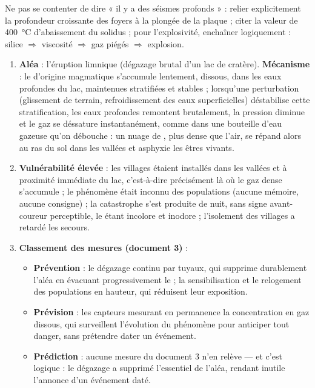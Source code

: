 \documentclass[11pt]{article}
\newcommand{\cle}[1]{{\popxbold\color{popdark}#1}}
\begin{document}
\begin{attention}
Ne pas se contenter de dire « il y a des séismes profonds » : relier explicitement la profondeur croissante des foyers à la plongée de la plaque ; citer la valeur de \SI{400}{\celsius} d'abaissement du solidus ; pour l'explosivité, enchaîner logiquement : silice $\Rightarrow$ viscosité $\Rightarrow$ gaz piégés $\Rightarrow$ explosion.
\end{attention}

\begin{corrige}
\begin{enumerate}
\item \textbf{Aléa} : l'\cle{éruption limnique} (dégazage brutal d'un lac de cratère). \textbf{Mécanisme} : le  d'origine magmatique s'accumule lentement, dissous, dans les eaux profondes du lac, maintenues stratifiées et stables ; lorsqu'une perturbation (glissement de terrain, refroidissement des eaux superficielles) déstabilise cette stratification, les eaux profondes remontent brutalement, la pression diminue et le gaz se déssature instantanément, comme dans une bouteille d'eau gazeuse qu'on débouche : un nuage de , plus dense que l'air, se répand alors au ras du sol dans les vallées et asphyxie les êtres vivants.
\item \textbf{Vulnérabilité élevée} : les villages étaient installés dans les vallées et à proximité immédiate du lac, c'est-à-dire précisément là où le gaz dense s'accumule ; le phénomène était inconnu des populations (aucune mémoire, aucune consigne) ; la catastrophe s'est produite de nuit, sans signe avant-coureur perceptible, le  étant incolore et inodore ; l'isolement des villages a retardé les secours.
\item \textbf{Classement des mesures (document 3)} :
\begin{itemize}
\item \textbf{Prévention} : le dégazage continu par tuyaux, qui supprime durablement l'aléa en évacuant progressivement le  ; la sensibilisation et le relogement des populations en hauteur, qui réduisent leur exposition.
\item \textbf{Prévision} : les capteurs mesurant en permanence la concentration en gaz dissous, qui surveillent l'évolution du phénomène pour anticiper tout danger, sans prétendre dater un événement.
\item \textbf{Prédiction} : aucune mesure du document 3 n'en relève — et c'est logique : le dégazage a supprimé l'essentiel de l'aléa, rendant inutile l'annonce d'un événement daté.

\end{itemize}
\end{enumerate}
\end{corrige}
\end{document}
